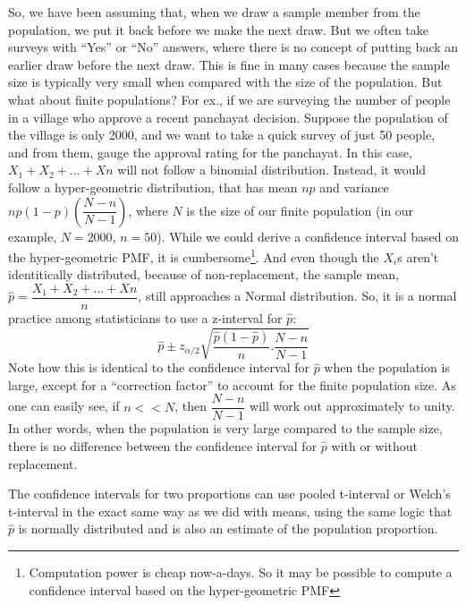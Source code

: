 So, we have been assuming that, when we draw a sample member from the population, we put it back before we make the next draw. But we often take surveys with ``Yes'' or ``No'' answers, where there is no concept of putting back an earlier draw before the next draw. This is fine in many cases because the sample size is typically very small when compared with the size of the population. But what about finite populations? For ex., if we are surveying the number of people in a village who approve a recent panchayat decision. Suppose the population of the village is only 2000, and we want to take a quick survey of just 50 people, and from them, gauge the approval rating for the panchayat. In this case, \( X_1+X_2+...+Xn \) will not follow a binomial distribution. Instead, it would follow a hyper-geometric distribution, that has mean $np$ and variance \( np(1-p) \left(\dfrac{N - n}{N - 1}\right) \), where $N$ is the size of our finite population (in our example, $N = 2000$, $n = 50$). While we could derive a confidence interval based on the hyper-geometric PMF, it is cumbersome\footnote{Computation power is cheap now-a-days. So it may be possible to compute a confidence interval based on the hyper-geometric PMF}. And even though the $X_i$s aren't identitically distributed, because of non-replacement, the sample mean, \( \hat{p} = \dfrac{X_1+X_2+...+Xn}{n} \), still approaches a Normal distribution. So, it is a normal practice among statisticians to use a z-interval for $\hat{p}$:
	\[ \hat{p}\pm z_{\alpha/2}\sqrt{\dfrac{\hat{p}(1-\hat{p})}{n} . \dfrac{N-n}{N-1}} \]
Note how this is identical to the confidence interval for $\hat{p}$ when the population is large, except for a ``correction factor'' to account for the finite population size. As one can easily see, if $n<<N$, then \( \dfrac{N - n}{N - 1} \) will work out approximately to unity. In other words, when the population is very large compared to the sample size, there is no difference between the confidence interval for $\hat{p}$ with or without replacement.

The confidence intervals for two proportions can use pooled t-interval or Welch's t-interval in the exact same way as we did with means, using the same logic that $\hat{p}$ is normally distributed and is also an estimate of the population proportion. 

